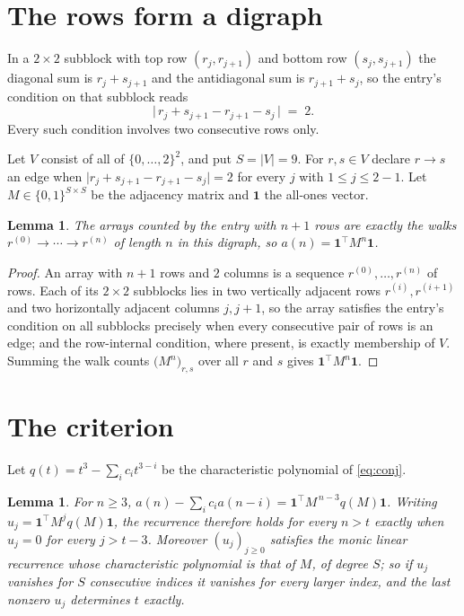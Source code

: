 \documentclass[11pt,a4paper]{article}
\theoremstyle{plain}
\newtheorem{lemma}[theorem]{Lemma}
\theoremstyle{definition}
\begin{document}
\section{The rows form a digraph}

In a $2\times2$ subblock with top row $(r_j,r_{j+1})$ and bottom row $(s_j,s_{j+1})$ the
diagonal sum is $r_j+s_{j+1}$ and the antidiagonal sum is $r_{j+1}+s_j$, so the entry's
condition on that subblock reads
\[
\bigl|\,r_j+s_{j+1}-r_{j+1}-s_j\,\bigr|\;=\;2.
\]
Every such condition involves two consecutive rows only.

Let $V$ consist of all of $\{0,\dots,2\}^{2}$, and put $S=|V|=9$. For $r,s\in V$ declare $r\to s$ an edge
when $\bigl|r_j+s_{j+1}-r_{j+1}-s_j\bigr|=2$ for every $j$ with
$1\le j\le2-1$. Let $M\in\{0,1\}^{S\times S}$ be the adjacency matrix and $\mathbf{1}$
the all-ones vector.

\begin{lemma}\label{lem:walk}
The arrays counted by the entry with $n+1$ rows are exactly the walks
$r^{(0)}\to\cdots\to r^{(n)}$ of length $n$ in this digraph, so
$a(n)=\mathbf{1}^{\!\top}M^{n}\mathbf{1}$.
\end{lemma}

\begin{proof}
An array with $n+1$ rows and $2$ columns is a sequence $r^{(0)},\dots,r^{(n)}$ of
rows. Each of its $2\times2$ subblocks lies in two vertically adjacent rows
$r^{(i)},r^{(i+1)}$ and two horizontally adjacent columns $j,j+1$, so the array satisfies
the entry's condition on all subblocks precisely when every consecutive pair of rows is an
edge; and the row-internal condition, where present, is exactly membership of $V$. Summing
the walk counts $\bigl(M^{n}\bigr)_{r,s}$ over all $r$ and $s$ gives
$\mathbf{1}^{\!\top}M^{n}\mathbf{1}$.
\end{proof}

\section{The criterion}

Let $q(t)=t^{3}-\sum_i c_i t^{3-i}$ be the characteristic polynomial of
\eqref{eq:conj}.

\begin{lemma}\label{lem:crit}
For $n\ge3$,
$a(n)-\sum_i c_i a(n-i)=\mathbf{1}^{\!\top}M^{\,n-3}q(M)\mathbf{1}$. Writing
$u_j=\mathbf{1}^{\!\top}M^{j}q(M)\mathbf{1}$, the recurrence therefore holds for every
$n>t$ exactly when $u_j=0$ for every $j>t-3$. Moreover $(u_j)_{j\ge0}$ satisfies the
monic linear recurrence whose characteristic polynomial is that of $M$, of degree $S$; so
if $u_j$ vanishes for $S$ consecutive indices it vanishes for every larger index, and the
last nonzero $u_j$ determines $t$ exactly.
\end{lemma}
\end{document}
